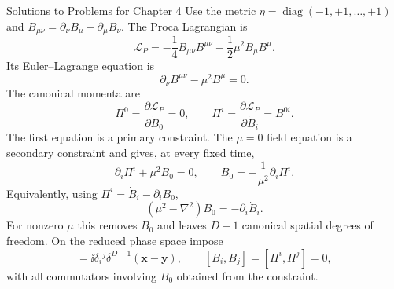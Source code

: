 \begin{bankssolutions}{Solutions to Problems for Chapter 4}
Use the metric $\eta=\operatorname{diag}(-1,+1,\ldots,+1)$ and
$B_{\mu\nu}=\partial_\nu B_\mu-\partial_\mu B_\nu$.  The Proca Lagrangian is
\begin{equation*}
 \mathcal L_P=-\frac14B_{\mu\nu}B^{\mu\nu}-\frac12\mu^2B_\mu B^\mu.
\end{equation*}
Its Euler--Lagrange equation is
\begin{equation*}
 \partial_\nu B^{\mu\nu}-\mu^2B^\mu=0.
\end{equation*}
The canonical momenta are
\begin{equation*}
 \Pi^0=\frac{\partial\mathcal L_P}{\partial\dot B_0}=0,
 \qquad
 \Pi^i=\frac{\partial\mathcal L_P}{\partial\dot B_i}=B^{0i}.
\end{equation*}
The first equation is a primary constraint.  The $\mu=0$ field equation is a
secondary constraint and gives, at every fixed time,
\begin{equation*}
 \partial_i\Pi^i+\mu^2B_0=0,
 \qquad
 B_0=-\frac{1}{\mu^2}\partial_i\Pi^i.
\end{equation*}
Equivalently, using $\Pi^i=\dot B_i-\partial_iB_0$,
\begin{equation*}
 (\mu^2-\nabla^2)B_0=-\partial_i\dot B_i.
\end{equation*}
For nonzero $\mu$ this removes $B_0$ and leaves $D-1$ canonical spatial
degrees of freedom.  On the reduced phase space impose
\begin{equation*}
 [B_i(t,\mathbf x),\Pi^j(t,\mathbf y)]
 =\ii\delta_i{}^j\delta^{D-1}(\mathbf x-\mathbf y),
 \qquad [B_i,B_j]=[\Pi^i,\Pi^j]=0,
\end{equation*}
with all commutators involving $B_0$ obtained from the constraint.


\end{bankssolutions}
